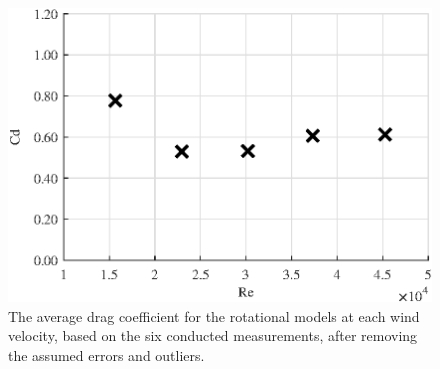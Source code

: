 


\begin{figure}[h!]
    \centering
    \includegraphics[width=\linewidth]{0_Images/RotationalAverageRe.eps}
    \caption{The average drag coefficient for the rotational models at each wind velocity, based on the six conducted measurements, after removing the assumed errors and outliers.}
    \label{fig:RotationalAvg}
\end{figure}


